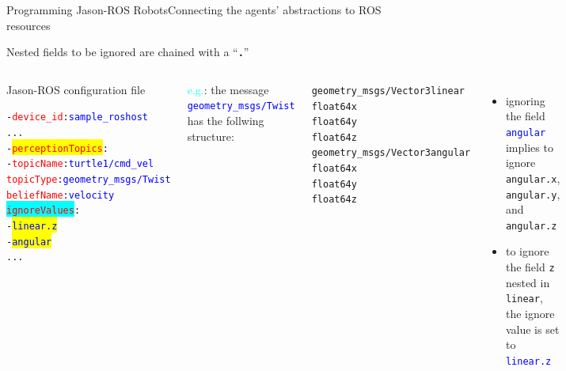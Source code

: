 \documentclass[compress]{beamer}
\newcommand{\yamlkey}[1]{\textcolor{red}{\texttt{#1}}}
\newcommand{\yamlvalue}[1]{\textcolor{blue}{\texttt{#1}}}
\begin{document}
\begin{frame}[fragile]{Programming Jason-ROS Robots}{Connecting the agents' abstractions to ROS resources}


\footnotesize
Nested fields to be ignored are chained with a ``{\Large{\bf\texttt{.}}}''

\vspace{.5cm}

\begin{columns}
 
\begin{block}{{\scriptsize Jason-ROS configuration file}}
\scriptsize
  \begin{alltt}
- \yamlkey{device_id}: \yamlvalue{sample_roshost}    
     ...
  - \colorbox{yellow}{\yamlkey{perceptionTopics}}:     
    - \yamlkey{topicName}: \yamlvalue{turtle1/cmd_vel}
      \yamlkey{topicType}: \yamlvalue{geometry_msgs/Twist}
      \yamlkey{beliefName}: \yamlvalue{velocity} 
     \colorbox{cyan}{\yamlkey{ignoreValues}}:
        - \colorbox{yellow}{\yamlvalue{linear.z}}
        - \colorbox{yellow}{\yamlvalue{angular}}
     ...
  \end{alltt}
\end{block}  

 \scriptsize
 \textcolor{cyan}{e.g.}: the message \yamlvalue{geometry\_msgs/Twist} has the follwing structure:
 \tiny
   \begin{alltt}   
geometry_msgs/Vector3 linear
  float64 x  
  float64 y  
  float64 z  
geometry_msgs/Vector3 angular
  float64 x  
  float64 y  
  float64 z  
   \end{alltt}

 \scriptsize
 
 \begin{itemize}
  \item ignoring the field \yamlvalue{angular} implies to ignore \texttt{angular.x}, \texttt{angular.y}, and \texttt{angular.z}
  \item to ignore the field \texttt{z} nested in \texttt{linear}, the ignore value is set to \yamlvalue{linear.z}
 \end{itemize}

 

 
 
 
\end{columns}



\end{frame}
\end{document}
